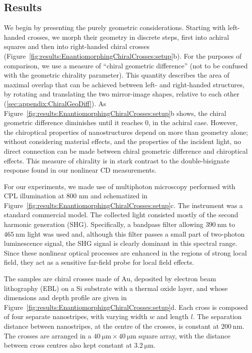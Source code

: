 \subsection{Results}\label{sec:results:EnantiomorphingChiralCrosses:results}

We begin by presenting the purely geometric considerations. Starting with left-handed crosses, we morph their geometry in discrete steps, first into achiral squares and then into right-handed chiral crosses (Figure~\ref{fig:results:EnantiomorphingChiralCrosses:setup}b). For the purposes of comparison, we use a measure of ``chiral geometric difference'' (not to be confused with the geometric chirality parameter). 
This quantity describes the area of maximal overlap that can be achieved between left- and right-handed structures, by rotating and translating the two mirror-image shapes, relative to each other (\ref{sec:appendix:ChiralGeoDiff}). 
As Figure~\ref{fig:results:EnantiomorphingChiralCrosses:setup}b shows, the chiral geometric difference diminishes until it reaches 0, in the achiral case. However, the chiroptical properties of nanostructures depend on more than geometry alone; without considering material effects, and the properties of the incident light, no direct connection can be made between chiral geometric difference and chiroptical effects. This measure of chirality is in stark contrast to the double-bisignate response found in our nonlinear CD measurements.

For our experiments, we made use of multiphoton microscopy performed with CPL illumination at 800 nm and schematized in Figure~\ref{fig:results:EnantiomorphingChiralCrosses:setup}c. The instrument was a standard commercial model. The collected light consisted mostly of the second harmonic generation (SHG). Specifically, a bandpass filter allowing $\SI{390}{\nano\m}$ to $\SI{465}{\nano\m}$ light was used and, although this filter passes a small part of two-photon luminescence signal, the SHG signal is clearly dominant in this spectral range. Since these nonlinear optical processes are enhanced in the regions of strong local field, \cite{Wang2013, Chen1983} they act as a sensitive far-field probe for local field effects. 

The samples are chiral crosses made of Au, deposited by electron beam lithography (EBL) on a Si substrate with a thermal oxide layer, and whose dimensions and depth profile are given in Figure~\ref{fig:results:EnantiomorphingChiralCrosses:setup}d. Each cross is composed of four separate nanostripes, with varying width $w$ and length $l$. The separation distance between nanostripes, at the centre of the crosses, is constant at $\SI{200}{\nano\m}$. The crosses are arranged in a $\SI{40}{\micro\m} \times \SI{40}{\micro\m}$ square array, with the distance between cross centres also kept constant at $\SI{3.2}{\micro\m}$. 

